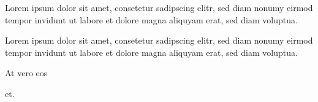 


{}

Lorem ipsum dolor sit amet, consetetur sadipscing elitr, sed
diam nonumy eirmod tempor invidunt ut labore et dolore magna aliquyam
erat, sed diam voluptua.


\clozeparcapture Lorem ipsum dolor sit amet, consetetur sadipscing
elitr, sed diam nonumy eirmod tempor invidunt ut labore et dolore magna
aliquyam erat, sed diam voluptua.


At vero \clozeparcapture eos \par et.

\bye
